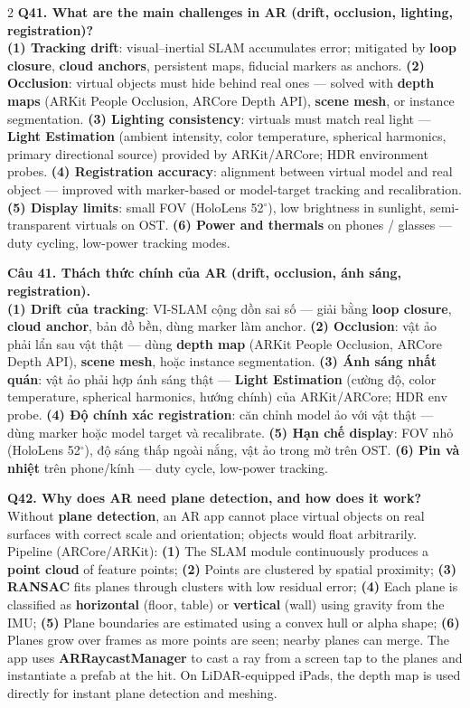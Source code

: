 \begin{paracol}{2}
\textbf{Q41. What are the main challenges in AR (drift, occlusion, lighting, registration)?}\\
\textbf{(1) Tracking drift}: visual--inertial SLAM accumulates error; mitigated by \textbf{loop closure}, \textbf{cloud anchors}, persistent maps, fiducial markers as anchors. \textbf{(2) Occlusion}: virtual objects must hide behind real ones --- solved with \textbf{depth maps} (ARKit People Occlusion, ARCore Depth API), \textbf{scene mesh}, or instance segmentation. \textbf{(3) Lighting consistency}: virtuals must match real light --- \textbf{Light Estimation} (ambient intensity, color temperature, spherical harmonics, primary directional source) provided by ARKit/ARCore; HDR environment probes. \textbf{(4) Registration accuracy}: alignment between virtual model and real object --- improved with marker-based or model-target tracking and recalibration. \textbf{(5) Display limits}: small FOV (HoloLens 52$^\circ$), low brightness in sunlight, semi-transparent virtuals on OST. \textbf{(6) Power and thermals} on phones / glasses --- duty cycling, low-power tracking modes.

\switchcolumn

\textbf{Câu 41. Thách thức chính của AR (drift, occlusion, ánh sáng, registration).}\\
\textbf{(1) Drift của tracking}: VI-SLAM cộng dồn sai số --- giải bằng \textbf{loop closure}, \textbf{cloud anchor}, bản đồ bền, dùng marker làm anchor. \textbf{(2) Occlusion}: vật ảo phải lẩn sau vật thật --- dùng \textbf{depth map} (ARKit People Occlusion, ARCore Depth API), \textbf{scene mesh}, hoặc instance segmentation. \textbf{(3) Ánh sáng nhất quán}: vật ảo phải hợp ánh sáng thật --- \textbf{Light Estimation} (cường độ, color temperature, spherical harmonics, hướng chính) của ARKit/ARCore; HDR env probe. \textbf{(4) Độ chính xác registration}: căn chỉnh model ảo với vật thật --- dùng marker hoặc model target và recalibrate. \textbf{(5) Hạn chế display}: FOV nhỏ (HoloLens 52$^\circ$), độ sáng thấp ngoài nắng, vật ảo trong mờ trên OST. \textbf{(6) Pin và nhiệt} trên phone/kính --- duty cycle, low-power tracking.

\switchcolumn*

\textbf{Q42. Why does AR need plane detection, and how does it work?}\\
Without \textbf{plane detection}, an AR app cannot place virtual objects on real surfaces with correct scale and orientation; objects would float arbitrarily. Pipeline (ARCore/ARKit): \textbf{(1)} The SLAM module continuously produces a \textbf{point cloud} of feature points; \textbf{(2)} Points are clustered by spatial proximity; \textbf{(3)} \textbf{RANSAC} fits planes through clusters with low residual error; \textbf{(4)} Each plane is classified as \textbf{horizontal} (floor, table) or \textbf{vertical} (wall) using gravity from the IMU; \textbf{(5)} Plane boundaries are estimated using a convex hull or alpha shape; \textbf{(6)} Planes grow over frames as more points are seen; nearby planes can merge. The app uses \textbf{ARRaycastManager} to cast a ray from a screen tap to the planes and instantiate a prefab at the hit. On LiDAR-equipped iPads, the depth map is used directly for instant plane detection and meshing.


\end{paracol}
